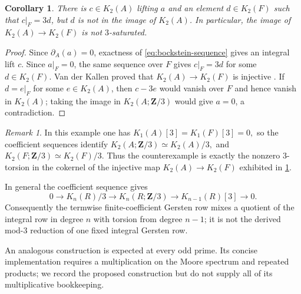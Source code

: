 \documentclass[10pt]{amsart}
\newtheorem{corollary}[corollary]{Corollary}
\theoremstyle{remark}
\newtheorem{remark}[remark]{Remark}
\begin{document}
\begin{corollary}\label{cor:saturation}
There is $c\in K_2(A)$ lifting $a$ and an element $d\in K_2(F)$ such that
$c|_F=3d$, but $d$ is not in the image of $K_2(A)$.  In particular, the
image of $K_2(A)\to K_2(F)$ is not $3$-saturated.
\end{corollary}

\begin{proof}
Since $\partial_A(a)=0$, exactness of \eqref{eq:bockstein-sequence}
gives an integral lift $c$.  Since $a|_F=0$, the same sequence over $F$
gives $c|_F=3d$ for some $d\in K_2(F)$.  Van der Kallen proved that
$K_2(A)\to K_2(F)$ is injective
\cite[main theorem]{VanDerKallen76KTwoSurface}.  If $d=e|_F$ for some
$e\in K_2(A)$, then $c-3e$ would vanish over $F$ and hence vanish in
$K_2(A)$; taking the image in $K_2(A;\mathbf Z/3)$ would give $a=0$, a contradiction.
\end{proof}

\begin{remark}\label{rem:derived}
	In this example one has
	\(
	K_1(A)[3]=K_1(F)[3]=0,
	\)
	so the coefficient sequences identify
	\(
	K_2(A;\mathbf Z/3)\simeq K_2(A)/3,
	\) and
	\(
	K_2(F;\mathbf Z/3)\simeq K_2(F)/3.
	\)
	Thus the counterexample is exactly the nonzero \(3\)-torsion in the
	cokernel of the injective map \(K_2(A)\to K_2(F)\) exhibited in
	\cref{cor:saturation}.
	
	In general the coefficient sequence gives
\[
 0\longrightarrow K_n(R)/3\longrightarrow K_n(R;\mathbf Z/3)
 \longrightarrow K_{n-1}(R)[3]\longrightarrow0.
\]
Consequently the termwise finite-coefficient Gersten row mixes a quotient
of the integral row in degree $n$ with torsion from degree $n-1$; it is
not the derived mod-$3$ reduction of one fixed integral Gersten row.
\end{remark}


An analogous construction is expected at every odd prime.  Its concise
implementation requires a multiplication on the Moore spectrum and
repeated products; we record the proposed construction but do not
supply all of its multiplicative bookkeeping.
\end{document}
